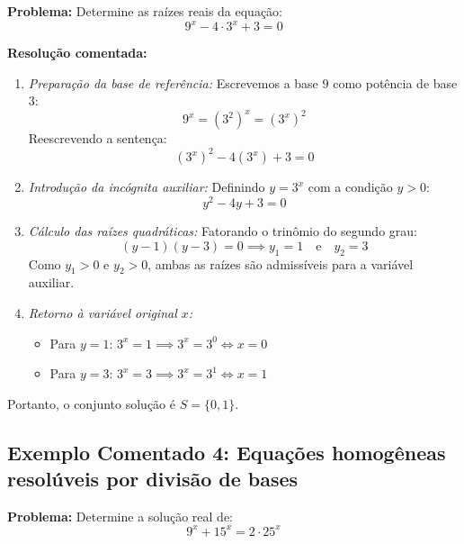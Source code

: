 \documentclass[12pt,a4paper]{report}
\begin{document}
	\textbf{Problema:} Determine as raízes reais da equação:
	\[
	9^x - 4 \cdot 3^x + 3 = 0
	\]
	
	\textbf{Resolução comentada:}
	\begin{enumerate}[label=\alph*)]
		\item \textit{Preparação da base de referência:} Escrevemos a base $9$ como potência de base $3$:
		\[
		9^x = (3^2)^x = (3^x)^2
		\]
		Reescrevendo a sentença:
		\[
		(3^x)^2 - 4(3^x) + 3 = 0
		\]
		\item \textit{Introdução da incógnita auxiliar:} Definindo $y = 3^x$ com a condição $y > 0$:
		\[
		y^2 - 4y + 3 = 0
		\]
		\item \textit{Cálculo das raízes quadráticas:}
		Fatorando o trinômio do segundo grau:
		\[
		(y - 1)(y - 3) = 0 \implies y_1 = 1 \quad \text{e} \quad y_2 = 3
		\]
		Como $y_1 > 0$ e $y_2 > 0$, ambas as raízes são admissíveis para a variável auxiliar.
		\item \textit{Retorno à variável original $x$:}
		\begin{itemize}
			\item Para $y = 1$: $3^x = 1 \implies 3^x = 3^0 \iff x = 0$
			\item Para $y = 3$: $3^x = 3 \implies 3^x = 3^1 \iff x = 1$
		\end{itemize}
	\end{enumerate}
	Portanto, o conjunto solução é $S = \{0, 1\}$.
	
	\vspace{0.3cm}
	
	\subsection*{Exemplo Comentado 4: Equações homogêneas resolúveis por divisão de bases}
	
	\textbf{Problema:} Determine a solução real de:
	\[
	9^x + 15^x = 2 \cdot 25^x
	\]
	
\end{document}
